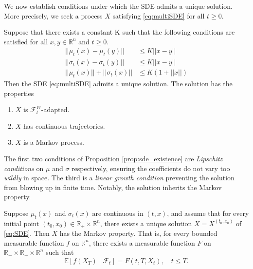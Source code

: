 We now establish conditions under which the SDE admits a unique solution. More precisely, we seek a process $X$ satisfying \eqref{eq:multiSDE} for all $t\geq0$.

\begin{proposition}
\label{prop:sde_existence}
    Suppose that there exists a constant K such that the following conditions are satisfied for all $x,y\in\mathbb{R}^n$ and $t\geq0$.
    \begin{align}
     ||\mu_t(x)-\mu_t(y)||&\leq K ||x - y||\\
     ||\sigma_t(x)-\sigma_t(y)||&\leq K ||x - y||\\
     ||\mu_t(x)||+||\sigma_t(x)||&\leq K (1+||x||)
    \end{align}
     Then the SDE \eqref{eq:multiSDE} admits a unique solution. The solution has the properties
    \begin{enumerate}
        \item $X$ is $\mathcal{F}_t^W$-adapted.
        \item $X$ has continuous trajectories.
        \item $X$ is a Markov process.
    \end{enumerate}
\end{proposition}

The first two conditions of Proposition \ref{prop:sde_existence} are \textit{Lipschitz conditions} on $\mu$ and $\sigma$ respectively, ensuring the coefficients do not vary too \textit{wildly} in space. The third is a \textit{linear growth condition} preventing the solution from blowing up in finite time. Notably, the solution inherits the Markov property. 


\begin{theorem}
\label{thm:markov}
    Suppose $\mu_t(x)$ and $\sigma_t(x)$ are continuous in $(t,x)$, and assume 
    that for every initial point $(t_0, x_0) \in \mathbb{R}_+ \times \mathbb{R}^n$, 
    there exists a unique solution $X = X^{(t_0,x_0)}$ of \eqref{eq:SDE}. 
    Then $X$ has the Markov property. That is, for every bounded measurable 
    function $f$ on $\mathbb{R}^n$, there exists a measurable function $F$ on 
    $\mathbb{R}_+ \times \mathbb{R}_+ \times \mathbb{R}^n$ such that
    \begin{equation}
        \mathbb{E}[f(X_T) \mid \mathcal{F}_t] = F(t, T, X_t), \quad t \leq T.
    \end{equation}
\end{theorem}

